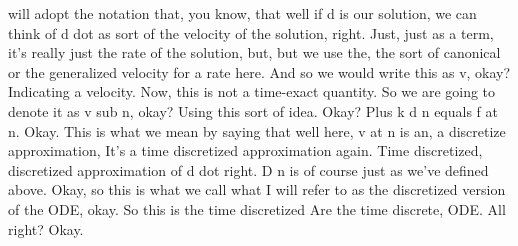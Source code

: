 \documentclass[10pt]{article}
\begin{document}
will adopt the notation that, you know, that well if d is our solution, we can think of d dot as sort of the velocity of the solution, right. Just, just as a term, it's really just the rate of the solution, but, but we use the, the sort of canonical or the generalized velocity for a rate here. And so we would write this as v, okay? Indicating a velocity. Now, this is not a time-exact quantity. So we are going to denote it as v sub n, okay? Using this sort of idea. Okay? Plus k d n equals f at n. Okay. This is what we mean by saying that well here, v at n is an, a discretize approximation, It's a time discretized approximation again. Time discretized, discretized approximation of d dot right. D n is of course just as we've defined above. Okay, so this is what we call what I will refer to as the discretized version of the ODE, okay. So this is the time discretized Are the time discrete, ODE. All right? Okay.
\end{document}
